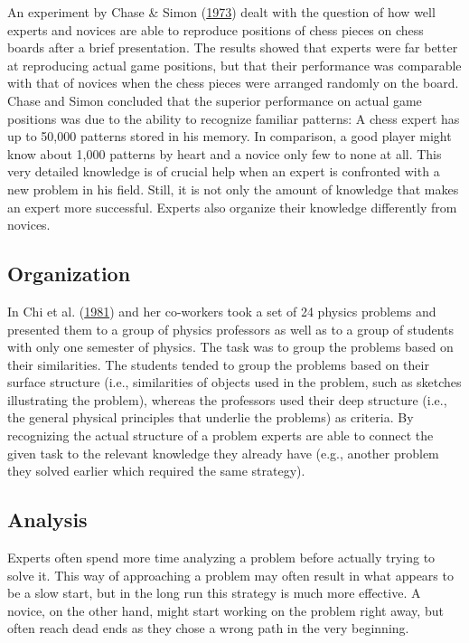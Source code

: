 \documentclass[
]{krantz}
\begin{document}
An experiment by Chase \& Simon (\protect\hyperlink{ref-Chase1973}{1973}) dealt with the question of how well experts and novices are able to reproduce positions of chess pieces on chess boards after a brief presentation. The results showed that experts were far better at reproducing actual game positions, but that their performance was comparable with that of novices when the chess pieces were arranged randomly on the board. Chase and Simon concluded that the superior performance on actual game positions was due to the ability to recognize familiar patterns: A chess expert has up to 50,000 patterns stored in his memory. In comparison, a good player might know about 1,000 patterns by heart and a novice only few to none at all. This very detailed knowledge is of crucial help when an expert is confronted with a new problem in his field. Still, it is not only the amount of knowledge that makes an expert more successful. Experts also organize their knowledge differently from novices.

\hypertarget{organization}{%
\subsection*{Organization}\label{organization}}


In Chi et al. (\protect\hyperlink{ref-Chi1981}{1981}) and her co-workers took a set of 24 physics problems and presented them to a group of physics professors as well as to a group of students with only one semester of physics. The task was to group the problems based on their similarities. The students tended to group the problems based on their surface structure (i.e., similarities of objects used in the problem, such as sketches illustrating the problem), whereas the professors used their deep structure (i.e., the general physical principles that underlie the problems) as criteria. By recognizing the actual structure of a problem experts are able to connect the given task to the relevant knowledge they already have (e.g., another problem they solved earlier which required the same strategy).

\hypertarget{analysis}{%
\subsection*{Analysis}\label{analysis}}


Experts often spend more time analyzing a problem before actually trying to solve it. This way of approaching a problem may often result in what appears to be a slow start, but in the long run this strategy is much more effective. A novice, on the other hand, might start working on the problem right away, but often reach dead ends as they chose a wrong path in the very beginning.
\end{document}
